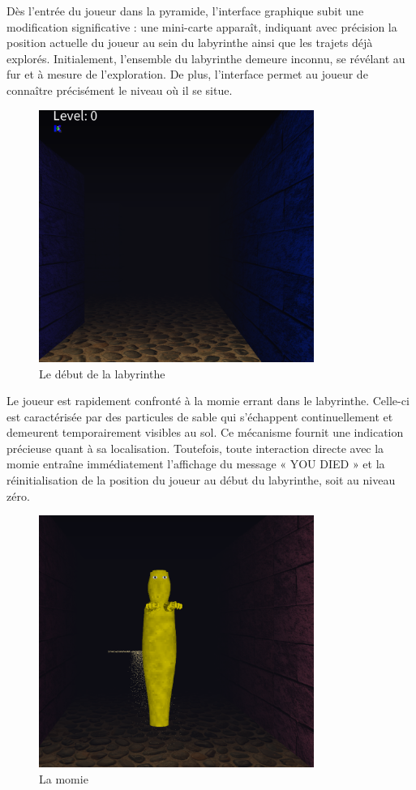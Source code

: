 \documentclass[12pt,oneside,letterpaper]{article}
\begin{document}
Dès l’entrée du joueur dans la pyramide, l’interface graphique subit une
modification significative : une mini-carte apparaît, indiquant avec précision
la position actuelle du joueur au sein du labyrinthe ainsi que les trajets déjà
explorés. Initialement, l'ensemble du labyrinthe demeure inconnu, se révélant
au fur et à mesure de l'exploration. De plus, l’interface permet au joueur de
connaître précisément le niveau où il se situe.
\begin{figure}[H]
    \centering
    \includegraphics[width=0.8\textwidth]{figures/beg-lab.png}
    \caption{Le début de la labyrinthe}
\end{figure}

Le joueur est rapidement confronté à la momie errant dans le labyrinthe.
Celle-ci est caractérisée par des particules de sable qui s’échappent
continuellement et demeurent temporairement visibles au sol. Ce mécanisme
fournit une indication précieuse quant à sa localisation. Toutefois, toute
interaction directe avec la momie entraîne immédiatement l’affichage du message
« YOU DIED » et la réinitialisation de la position du joueur au début du
labyrinthe, soit au niveau zéro.
\begin{figure}[H]
    \centering
    \includegraphics[width=0.8\textwidth]{figures/mummy.png}
    \caption{La momie}
\end{figure}
\end{document}
